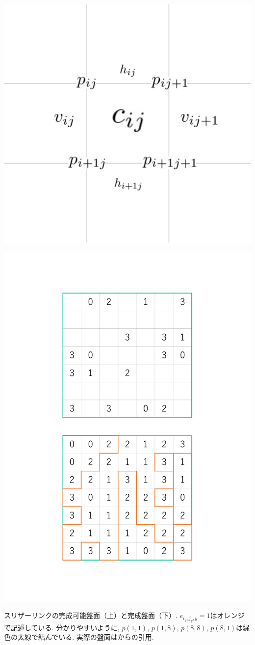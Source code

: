\begin{clearpagefigure}
  \includegraphics[width=0.85\linewidth,clip]{fig/define.png}
  \caption{}
  \label{figure:VariableAtBoard}
\end{clearpagefigure}

\begin{clearpagefigure}
  \includegraphics[width=0.85\linewidth,clip]{fig/slitherlink.pdf}
  \caption{スリザーリンクの完成可能盤面（上）と完成盤面（下）. $e_{i_y,j_y,y}=1$はオレンジで記述している. 分かりやすいように, $p(1,1)$, $p(1,8)$, $p(8,8)$, $p(8,1)$は緑色の太線で結んでいる. 実際の盤面は\cite{web:SlitherLink}からの引用. }
  \label{figure:SlitherLink}
\end{clearpagefigure}

